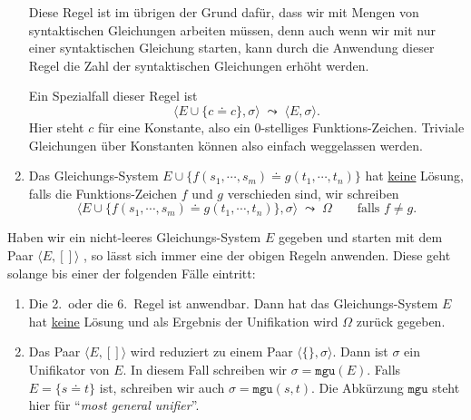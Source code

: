 \begin{enumerate}
      Diese Regel ist im \"{u}brigen der Grund daf\"{u}r, dass wir mit Mengen von syntaktischen Gleichungen
      arbeiten m\"{u}ssen, denn auch wenn wir mit nur einer syntaktischen Gleichung starten, kann 
      durch die Anwendung dieser Regel die Zahl der syntaktischen Gleichungen erh\"{o}ht werden.

      Ein Spezialfall dieser Regel ist 
      \[ \Big\langle E \cup \big\{ c \doteq c \big\}, \sigma \Big\rangle \;\leadsto\; 
         \Big\langle E, \sigma \Big\rangle.
      \]
      Hier steht $c$ f\"{u}r eine Konstante, also ein 0-stelliges Funktions-Zeichen. 
      Triviale Gleichungen \"{u}ber Konstanten k\"{o}nnen also einfach weggelassen werden.
\item Das Gleichungs-System $E \cup \big\{ f(s_1,\cdots,s_m) \doteq g(t_1,\cdots,t_n) \big\}$
      hat \underline{\color{red}keine} L\"{o}sung, falls die Funk\-tions-Zeichen $f$ und $g$ verschieden sind, wir schreiben
      \[ \Big\langle E \cup \big\{ f(s_1,\cdots,s_m) \doteq g(t_1,\cdots,t_n) \big\},
      \sigma \Big\rangle \;\leadsto\; \Omega \qquad \mbox{falls $f \not= g$}. \]
\end{enumerate}
Haben wir ein nicht-leeres Gleichungs-System $E$ gegeben und starten mit dem Paar 
$\langle E, []\rangle$  , so l\"{a}sst sich immer eine der
obigen Regeln anwenden.  Diese geht solange bis einer der folgenden F\"{a}lle eintritt:
\begin{enumerate}
\item Die 2.~oder die 6.~Regel ist anwendbar.  Dann hat das Gleichungs-System $E$ hat
      \underline{\color{red}keine} L\"{o}sung und als Ergebnis der Unifikation wird $\Omega$ zur\"uck gegeben.
\item Das Paar $\langle E, [] \rangle$ wird reduziert zu einem Paar $\langle \{\}, \sigma\rangle$.
      Dann ist $\sigma$ ein Unifikator von $E$.  In diesem Fall schreiben wir $\sigma = \mathtt{mgu}(E)$.
      Falls $E = \{ s \doteq t \}$ ist, schreiben wir auch $\sigma = \mathtt{mgu}(s, t)$.  Die Abk\"{u}rzung
      $\mathtt{mgu}$ steht hier f\"{u}r {``\emph{\color{blue}most general unifier}''}.
\end{enumerate}

